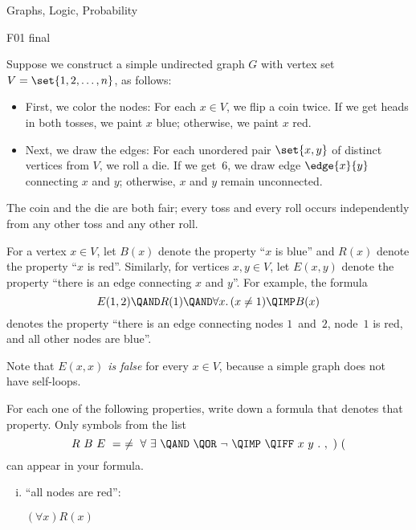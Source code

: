 \documentclass[quiz]{mcs}
\begin{document}
\begin{problem}
\begin{staffnotes}
Graphs, Logic, Probability

F01 final
\end{staffnotes}

Suppose we construct a simple undirected graph $G$ with vertex set
$V=\set{1,2,\dots,n}$, as follows:

\begin{itemize}
\item
First, we color the nodes: For each $x\in V$, we flip a coin twice. 
If we get heads in both tosses, we paint $x$ blue; otherwise, we paint 
$x$ red. 

\item
Next, we draw the edges: For each unordered pair $\set{x,y}$ of
distinct vertices from $V$, we roll a die. If we get~$6$, we draw edge
$\edge{x}{y}$ connecting $x$ and $y$; otherwise, $x$ and $y$ remain
unconnected.
\end{itemize} 

The coin and the die are both fair; every toss and every roll occurs
independently from any other toss and any other roll. 

For a vertex $x\in V$, let $B(x)$ denote the property ``$x$ is blue'' and
$R(x)$ denote the property ``$x$ is red''. Similarly, for vertices $x,y\in
V$, let $E(x,y)$ denote the property ``there is an edge connecting $x$ and
$y$''. For example, the formula
\[
E(1,2) \QAND R(1)  \QAND \forall x.\, (x \neq 1) \QIMP B(x)
\]
denotes the property ``there is an edge connecting nodes $1$~and~$2$,
node~$1$ is red, and all other nodes are blue''.

Note that \emph{$E(x,x)$ is false} for every $x \in V$, because a simple
graph does not have self-loops.

\bparts
\ppart
For each one of the following properties, write down a formula that
denotes that property.  Only symbols from the list
\[
R\ B\ E\ =\ \neq\ \forall\ \exists\ \QAND\ \QOR\ \neg\ \QIMP\ \QIFF\ x\ y\ .\ ,\ ) \ (
\]
can appear in your formula.

\begin{enumerate}[(i)]


\item \label{item-first} ``all nodes are red'': 

\begin{solution}
$(\forall x)R(x)$
\end{solution}


\end{enumerate}
\end{problem}
\end{document}
